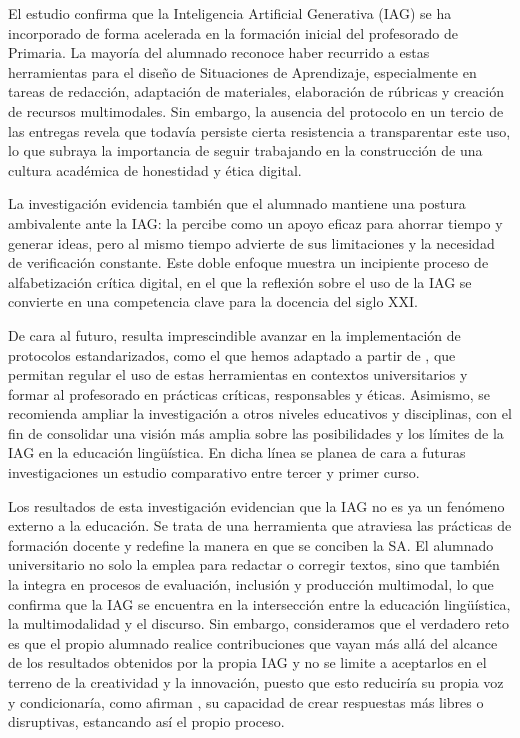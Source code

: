 \documentclass[spanish]{textolivre}
\begin{document}
El estudio confirma que la Inteligencia Artificial Generativa (IAG) se ha incorporado de forma acelerada en la formación inicial del profesorado de Primaria. La mayoría del alumnado reconoce haber recurrido a estas herramientas para el diseño de Situaciones de Aprendizaje, especialmente en tareas de redacción, adaptación de materiales, elaboración de rúbricas y creación de recursos multimodales. Sin embargo, la ausencia del protocolo en un tercio de las entregas revela que todavía persiste cierta resistencia a transparentar este uso, lo que subraya la importancia de seguir trabajando en la construcción de una cultura académica de honestidad y ética digital.

La investigación evidencia también que el alumnado mantiene una postura ambivalente ante la IAG: la percibe como un apoyo eficaz para ahorrar tiempo y generar ideas, pero al mismo tiempo advierte de sus limitaciones y la necesidad de verificación constante. Este doble enfoque muestra un incipiente proceso de alfabetización crítica digital, en el que la reflexión sobre el uso de la IAG se convierte en una competencia clave para la docencia del siglo XXI.

De cara al futuro, resulta imprescindible avanzar en la implementación de protocolos estandarizados, como el que hemos adaptado a partir de \textcite{CassanyCasarin2025}, que permitan regular el uso de estas herramientas en contextos universitarios y formar al profesorado en prácticas críticas, responsables y éticas. Asimismo, se recomienda ampliar la investigación a otros niveles educativos y disciplinas, con el fin de consolidar una visión más amplia sobre las posibilidades y los límites de la IAG en la educación lingüística. En dicha línea se planea de cara a futuras investigaciones un estudio comparativo entre tercer y primer curso.

Los resultados de esta investigación evidencian que la IAG no es ya un fenómeno externo a la educación. Se trata de una herramienta que atraviesa las prácticas de formación docente y redefine la manera en que se conciben la SA. El alumnado universitario no solo la emplea para redactar o corregir textos, sino que también la integra en procesos de evaluación, inclusión y producción multimodal, lo que confirma que la IAG se encuentra en la intersección entre la educación lingüística, la multimodalidad y el discurso. Sin embargo, consideramos que el verdadero reto es que el propio alumnado realice contribuciones que vayan más allá del alcance de los resultados obtenidos por la propia IAG y no se limite a aceptarlos en el terreno de la creatividad y la innovación, puesto que esto reduciría su propia voz y condicionaría, como afirman \textcite{MagroLara2025}, su capacidad de crear respuestas más libres o disruptivas, estancando así el propio proceso.
\end{document}
